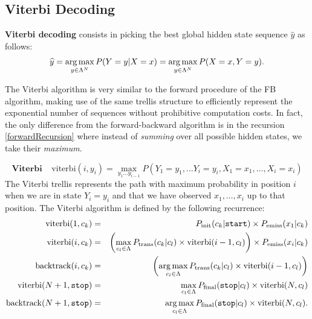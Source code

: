 %


\subsection{Viterbi Decoding}\label{viterbi}


\textbf{Viterbi decoding} consists in
picking the best global hidden state sequence 
$\widehat{y}$
as follows: 
\begin{equation}
\widehat{y} = \operatorname*{arg\,max}_{y \in \Lambda^N} P(Y=y|X=x) = \operatorname*{arg\,max}_{y \in \Lambda^N} P(X=x,Y=y).
\end{equation}

The Viterbi algorithm 
is very similar to the forward procedure of the FB algorithm,
making use of the same trellis structure to efficiently represent the exponential number of sequences without prohibitive computation costs. In fact, the only
difference from the forward-backward algorithm is in the recursion
\ref{forwardRecursion} where instead of \emph{summing} over all possible 
hidden states, we take their \emph{maximum}.

\begin{equation}
\label{eq::viterbi}
\mathbf{Viterbi }\;\;\;\;  \mathrm{viterbi}(i, y_i) = \max_{y_1...y_{i-1}} P(Y_1=y_1,\ldots Y_i = y_i , X_1=x_1,\ldots, X_i=x_i)
\end{equation}
The Viterbi trellis represents the path with maximum probability in
position
$i$ when we are in state $Y_i=y_i$ and that we have observed $x_1,\ldots,x_i$
up to that position. The Viterbi algorithm is defined by the
following recurrence: 
\begin{eqnarray}
\mathrm{viterbi}(1, c_k) &=& P_{\mathrm{init}}(c_k|\text{\tt start}) \times 
P_{\mathrm{emiss}}(x_1 | c_k)
 \\
 \mathrm{viterbi}(i, c_k) &=& \left( \displaystyle \max_{c_l \in \Lambda} P_{\mathrm{trans}}(c_k | c_l) \times \mathrm{viterbi}(i-1, c_l) \right) \times P_{\mathrm{emiss}}(x_i | c_k)  \label{viterbiRecursion}
 \\
 \mathrm{backtrack}(i, c_k) &=& \left( \displaystyle \operatorname*{arg\,max}_{c_l \in \Lambda} P_{\mathrm{trans}}(c_k | c_l) \times \mathrm{viterbi}(i-1, c_l) \right) 
 \\
  \mathrm{viterbi}(N+1, \text{\tt stop}) &=& \max_{c_l \in \Lambda} P_{\mathrm{final}}(\text{\tt stop} | c_l) \times \mathrm{viterbi}(N, c_l)
 \\
  \mathrm{backtrack}(N+1, \text{\tt stop}) &=& \operatorname*{arg\,max}_{c_l \in \Lambda} P_{\mathrm{final}}(\text{\tt stop} | c_l) \times \mathrm{viterbi}(N, c_l).
\end{eqnarray}


